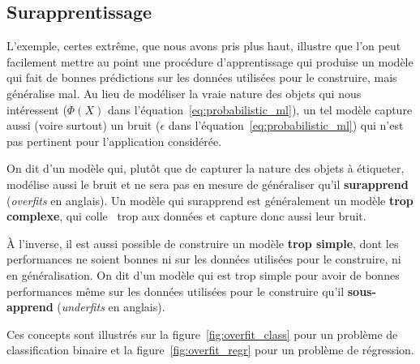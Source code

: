 \subsection{Surapprentissage}
L'exemple, certes extrême, que nous avons pris plus haut, illustre que l'on
peut facilement mettre au point une procédure d'apprentissage qui produise un
modèle qui fait de bonnes prédictions sur les données utilisées pour le
construire, mais généralise mal. Au lieu de modéliser la vraie nature des
objets qui nous intéressent ($\Phi(X)$ dans
l'équation~\eqref{eq:probabilistic_ml}), un tel modèle capture aussi (voire
surtout) un bruit ($\epsilon$ dans l'équation~\eqref{eq:probabilistic_ml}) qui
n'est pas pertinent pour l'application considérée.

On dit d'un modèle qui, plutôt que de capturer la nature des objets à
étiqueter, modélise aussi le bruit et ne sera pas en mesure de généraliser
qu'il \textbf{surapprend} (\textit{overfits} en anglais). 
Un modèle qui surapprend est généralement un modèle \textbf{trop complexe}, qui
\og colle \fg~trop aux données et capture donc aussi leur bruit.
  
À l'inverse, il est aussi possible de construire un modèle \textbf{trop simple},
dont les performances ne soient bonnes ni sur les données utilisées pour le
construire, ni en généralisation. 
On dit d'un modèle qui est trop simple pour avoir de bonnes performances même
sur les données utilisées pour le construire qu'il \textbf{sous-apprend} (\textit{underfits} en
anglais).

Ces concepts sont illustrés sur la figure~\ref{fig:overfit_class} pour un
problème de classification binaire et la figure~\ref{fig:overfit_regr} pour un
problème de régression.

